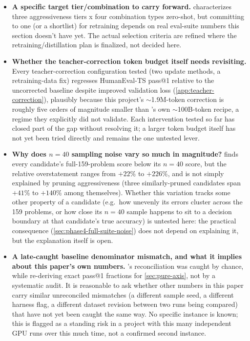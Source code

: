 \documentclass{article}
\theoremstyle{plain}
\theoremstyle{definition}
\theoremstyle{remark}
\begin{document}
\begin{itemize}
  retraining relative to their zero-shot rankings, and there is no
  precedent for whether the same holds for this project's specific
  three-axis combinations.
\item \textbf{A specific target tier/combination to carry forward.}
   characterizes three aggressiveness
  tiers x four combination types zero-shot, but committing to one (or a
  shortlist) for retraining depends on real eval-suite numbers this
  section doesn't have yet. The actual selection criteria are refined
  where the retraining/distillation plan is finalized, not decided here.
\item \textbf{Whether the teacher-correction token budget itself needs
  revisiting.} Every teacher-correction configuration tested (two
  update methods, a retraining-data fix) regresses HumanEval-TS
  pass@1 relative to the uncorrected baseline despite improved
  validation loss (\cref{app:teacher-correction}), plausibly because
  this project's $\sim$1.9M-token correction is roughly five orders of
  magnitude smaller than \citet{minitron2024practice}'s own
  $\sim$100B-token recipe, a regime they explicitly did not validate.
  Each intervention tested so far has closed part of the gap without
  resolving it; a larger token budget itself has not yet been tried
  directly and remains the one untested lever.
\item \textbf{Why does $n{=}40$ sampling noise vary so much in
  magnitude?}  finds every candidate's
  full-159-problem score below its $n{=}40$ score, but the relative
  overstatement ranges from $+22\%$ to $+226\%$, and is not simply
  explained by pruning aggressiveness (three similarly-pruned candidates
  span $+41\%$ to $+140\%$ among themselves). Whether this variation
  tracks some other property of a candidate (e.g.\ how unevenly its errors
  cluster across the 159 problems, or how close its $n{=}40$ sample
  happens to sit to a decision boundary at that candidate's true
  accuracy) is untested here: the practical consequence
  (\cref{sec:phase4-full-suite-noise}) does not depend on explaining it,
  but the explanation itself is open.
\item \textbf{A late-caught baseline denominator mismatch, and what it
  implies about this paper's own numbers.} 's
  reconciliation was caught by chance, while re-deriving exact pass@1
  fractions for \cref{sec:pure-axis}, not by a systematic audit. It is
  reasonable to ask whether other numbers in this paper carry similar
  unreconciled mismatches (a different sample seed, a different harness
  flag, a different dataset revision between two runs being compared)
  that have not yet been caught the same way. No specific instance is
  known; this is flagged as a standing risk in a
  project with this many independent GPU runs over this much time, not
  a confirmed second instance.
\end{itemize}
\end{document}
